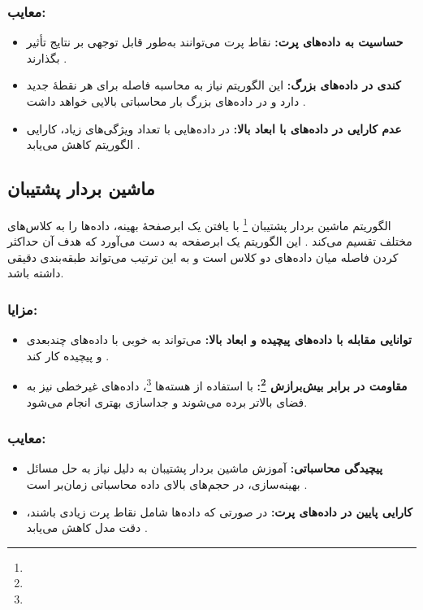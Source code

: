 \subsubsection{معایب:}
\begin{itemize}
	\item \textbf{حساسیت به داده‌های پرت:}  
	نقاط پرت می‌توانند به‌طور قابل توجهی بر نتایج تأثیر بگذارند
	\cite{duda1973pattern}.
	\item \textbf{کندی در داده‌های بزرگ:}  
	این الگوریتم نیاز به محاسبه فاصله برای هر نقطهٔ جدید دارد و در داده‌های بزرگ بار محاسباتی بالایی خواهد داشت
	\cite{mitchell1997machine}.
	\item \textbf{عدم کارایی در داده‌های با ابعاد بالا:}  
	در داده‌هایی با تعداد ویژگی‌های زیاد، کارایی الگوریتم کاهش می‌یابد \cite{murphy2012machine}.
\end{itemize}



\subsection{ماشین بردار پشتیبان}
الگوریتم ماشین بردار پشتیبان \footnote{} با یافتن یک ابرصفحهٔ بهینه، داده‌ها را به کلاس‌های مختلف تقسیم می‌کند
\cite{cortes1995support,vapnik1998statistical}.
این الگوریتم یک ابرصفحه به دست می‌آورد که هدف آن حداکثر کردن فاصله میان داده‌های دو کلاس است و به این ترتیب می‌تواند طبقه‌بندی دقیقی داشته باشد.

\subsubsection{مزایا:}
\begin{itemize}
	\item \textbf{توانایی مقابله با داده‌های پیچیده و ابعاد بالا:}
	 می‌تواند به خوبی با داده‌های چندبعدی و پیچیده کار کند
	\cite{vapnik1998statistical}.
	\item \textbf{مقاومت در برابر بیش‌برازش \footnote{}:}
با استفاده از هسته‌ها \footnote{}، داده‌های غیرخطی نیز به فضای بالاتر برده می‌شوند و جداسازی بهتری انجام می‌شود\cite{cortes1995support}.
\end{itemize}

\subsubsection{معایب:}
\begin{itemize}
	\item \textbf{پیچیدگی محاسباتی:}
	آموزش ماشین بردار پشتیبان به دلیل نیاز به حل مسائل بهینه‌سازی، در حجم‌های بالای داده محاسباتی زمان‌بر است
	\cite{murphy2012machine}.
	\item \textbf{کارایی پایین در داده‌های پرت:}
	در صورتی که داده‌ها شامل نقاط پرت زیادی باشند، دقت مدل کاهش می‌یابد
	\cite{bishop2006pattern}.
\end{itemize}


